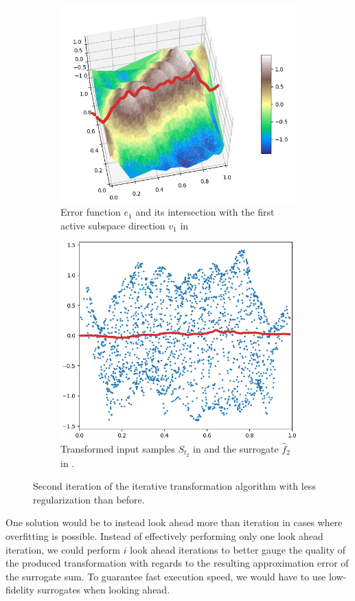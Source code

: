 \documentclass[
  a4paper,  %
  twoside,  %
  bibliography=totoc,
  headsepline,
  cleardoublepage=empty,
  parskip=half,
  draft=false
]{scrbook}
\begin{document}
\begin{mdframed}[style=style]
\begin{figure}[H]
\begin{subfigure}{.5\textwidth}
  \centering
  \includegraphics[width=.85\linewidth]{graphics/pipeline_bad_current_2.png}
  \caption{Error function $e_1$ and its intersection with the first active subspace direction $v_1$ in \reddot}
\label{fig:pipeline_bad_current_2}
\end{subfigure}%
\begin{subfigure}{.5\textwidth}
  \centering
  \includegraphics[width=.85\linewidth]{graphics/pipeline_bad_local_2.png}
  \caption{Transformed input samples $S_{t_2}$ in \blue and the surrogate $\hat{f}_2$ in \red.}
\label{fig:pipeline_bad_local_2}
\end{subfigure}
\delimit
\caption{Second iteration of the iterative transformation algorithm with less regularization than before.}
\label{fig:pipeline_bad_2}
\end{figure}
\end{mdframed}
%
One solution would be to instead look ahead more than iteration in cases where overfitting is possible.
Instead of effectively performing only one look ahead iteration, we could perform $i$ look ahead iterations to better gauge the quality of the produced transformation with regards to the resulting approximation error of the surrogate sum.
To guarantee fast execution speed, we would have to use low-fidelity surrogates when looking ahead.
\end{document}
